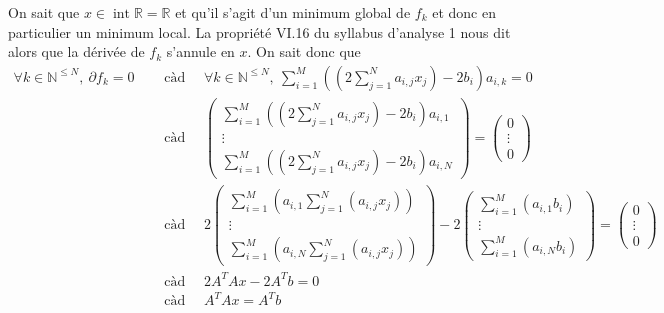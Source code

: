 \documentclass[a4paper, 10pt]{article}
\newcommand{\IR}{\mathbb{R}}
\newcommand{\IN}{\mathbb{N}}
\newcommand{\inte}{\operatorname{int}}
\begin{document}
\noindent
On sait que \( x \in \inte \IR = \IR \) et qu'il s'agit d'un minimum global de \( f_k \) et donc en particulier un minimum local. La propriété VI.16 du syllabus d'analyse 1 nous dit alors que la dérivée de \( f_k \) s'annule en \( x \). On sait donc que
\begin{align*}
    \forall k \in \IN^{\leq N},~ \partial f_k = 0
    & \quad \text{ càd } \quad \forall k \in \IN^{\leq N},~ \sum_{i = 1}^M \left( \left( 2 \sum_{j = 1}^N a_{i, j} x_j \right) - 2 b_i \right) a_{i, k} = 0 \\
    & \quad \text{ càd } \quad
        \begin{pmatrix}
        \displaystyle \sum_{i = 1}^M \left( \left( 2 \sum_{j = 1}^N a_{i, j} x_j \right) - 2 b_i \right) a_{i, 1} \\
        \vdots \\
        \displaystyle \sum_{i = 1}^M \left( \left( 2 \sum_{j = 1}^N a_{i, j} x_j \right) - 2 b_i \right) a_{i, N}
        \end{pmatrix}
        =
        \begin{pmatrix}
        0 \\
        \vdots \\
        0
        \end{pmatrix} \\
    & \quad \text{ càd } \quad
        2 \begin{pmatrix}
        \displaystyle \sum_{i = 1}^M \left( a_{i, 1} \sum_{j = 1}^N \left( a_{i, j} x_j \right) \right) \\
        \vdots \\
        \displaystyle \sum_{i = 1}^M \left( a_{i, N} \sum_{j = 1}^N \left( a_{i, j} x_j \right) \right)
        \end{pmatrix}
        -
        2 \begin{pmatrix}
        \displaystyle \sum_{i = 1}^M \left( a_{i, 1} b_i \right) \\
        \vdots \\
        \displaystyle \sum_{i = 1}^M \left( a_{i, N} b_i \right)
        \end{pmatrix}
        =
        \begin{pmatrix}
        0 \\
        \vdots \\
        0
        \end{pmatrix} \\
    & \quad \text{ càd } \quad 2 A^T A x - 2 A^T b = 0 \\
    & \quad \text{ càd } \quad A^T A x = A^T b
\end{align*}
\end{document}
